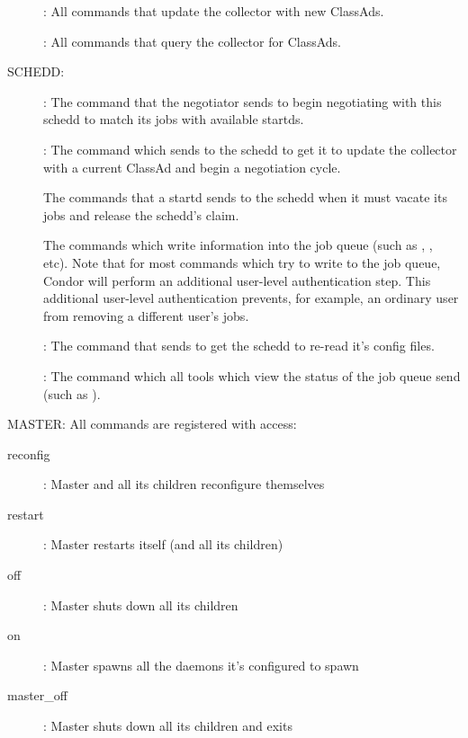 \begin{description}
\item[] : All commands that update the collector with
new ClassAds.

\item[] : All commands that query the collector for
ClassAds.
\end{description}

SCHEDD: 

\begin{description}
\item[] : The command that the negotiator sends to
  begin negotiating with this schedd to match its jobs with available
  startds.

\item[] : The command which  sends to
  the schedd to get it to update the collector with a current ClassAd
  and begin a negotiation cycle.

  The commands that a startd sends to the schedd when it must vacate
  its jobs and release the schedd's claim.

  The commands which write information into the job queue (such as
  , , etc).  
  Note that for most commands which try to write to the job queue, Condor
  will perform an additional user-level authentication step.  
  This additional user-level authentication prevents, for example, an
  ordinary user from removing a different user's jobs.

\item[] : The command that 
  sends to get the schedd to re-read it's config files.

\item[] : The command which all
  tools which view the status of the job queue send (such as
  ).  
\end{description}

MASTER:  All commands are registered with 
access:

\begin{description}
\item[reconfig] : Master and all its children reconfigure themselves
\item[restart] : Master restarts itself (and all its children)	
\item[off] : Master shuts down all its children
\item[on] : Master spawns all the daemons it's configured to spawn
\item[master\_off] : Master shuts down all its children and exits
\end{description}


